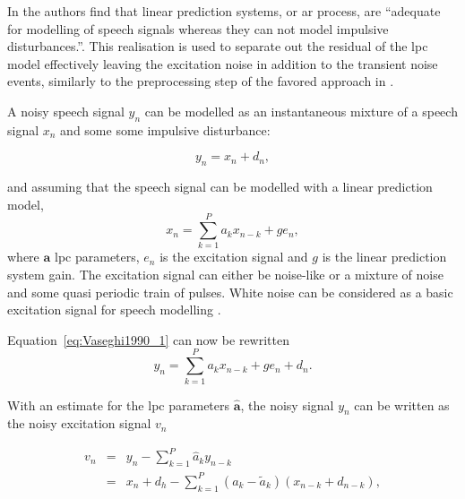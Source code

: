 In \cite{Vaseghi1990} the authors find that linear prediction systems, or \DIFdelbegin {}\DIFdelend \DIFaddbegin \gls{ar} \DIFaddend process, are ``adequate for modelling of speech signals whereas they can not model impulsive disturbances.''. This realisation is used to separate out the residual of the \DIFdelbegin {}\DIFdelend \DIFaddbegin \gls{lpc} \DIFaddend model effectively leaving the excitation noise in addition to the transient noise events, similarly to the preprocessing step of the favored approach in \cite{Kauppinen2002}.

A noisy speech signal $y_n$ can be modelled as an instantaneous mixture of a speech signal $x_n$ and some some impulsive disturbance:

\begin{equation}\label{eq:Vaseghi1990_1}
y_n = x_n + d_n,
\end{equation}

and assuming that the speech signal can be modelled with a linear prediction model,
\begin{equation}\label{eq:Vaseghi1990_4}
x_n = \sum^P_{k=1} a_k x_{n-k} +ge_n,
\end{equation}
where $\mathbf{a}$ \DIFdelbegin {}\DIFdelend \DIFaddbegin {}\gls{lpc} \DIFaddend parameters, $e_n$ is the excitation signal and $g$ is the linear prediction system gain. The excitation signal can either be noise-like or a mixture of noise and some quasi periodic train of pulses. White noise can be considered as a basic excitation signal for speech modelling \cite{Vaseghi1990}.

Equation~\ref{eq:Vaseghi1990_1} can now be rewritten
\begin{equation}\label{eq:Vaseghi1990_5}
y_n = \sum^P_{k=1} a_k x_{n-k} + ge_n + d_n.
\end{equation}

With an estimate for the \DIFdelbegin {}\DIFdelend \DIFaddbegin \gls{lpc} \DIFaddend parameters $\mathbf{\hat{a}}$, the noisy signal $y_n$ can be written as the noisy excitation signal $v_n$

\begin{eqnarray}
  v_n &=& y_n - \sum^P_{k=1} \hat{a}_k y_{n-k} \nonumber\\
  &=& x_n + d_h - \sum^P_{k=1} (a_k - \tilde{a}_k)(x_{n-k} + d_{n-k}),\label{eq:Vaseghi1990_6}
\end{eqnarray}


